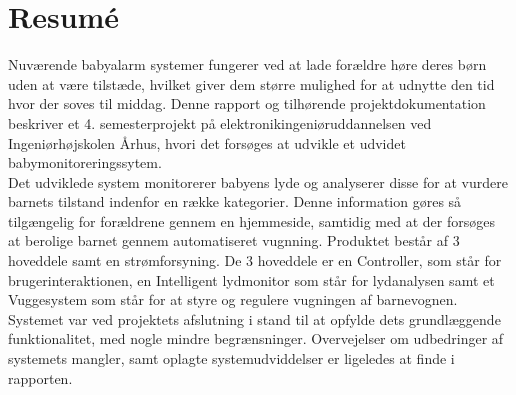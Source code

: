 \chapter{Resumé}

Nuværende babyalarm systemer fungerer ved at lade forældre høre deres børn uden at være tilstæde, hvilket giver dem større mulighed for at udnytte den tid hvor der soves til middag.
Denne rapport og tilhørende projektdokumentation beskriver et 4. semesterprojekt på elektronikingeniøruddannelsen ved Ingeniørhøjskolen Århus, hvori det forsøges at udvikle et udvidet babymonitoreringssytem.\\
Det udviklede system monitorerer babyens lyde og analyserer disse for at vurdere barnets tilstand indenfor en række kategorier. Denne information gøres så tilgængelig for forældrene gennem en hjemmeside, samtidig med at der forsøges at berolige barnet gennem automatiseret vugnning.
Produktet består af 3 hoveddele samt en strømforsyning. De 3 hoveddele er en Controller, som står for brugerinteraktionen, en Intelligent lydmonitor som står for lydanalysen samt et Vuggesystem som står for at styre og regulere vugningen af barnevognen. \\
Systemet var ved projektets afslutning i stand til at opfylde dets grundlæggende funktionalitet, med nogle mindre begrænsninger. Overvejelser om udbedringer af systemets mangler, samt oplagte systemudviddelser er ligeledes at finde i rapporten.\\

%
%
%

